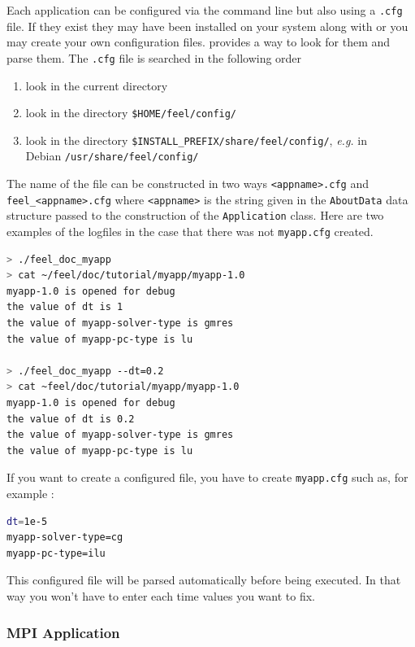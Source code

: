 Each application can be configured via the command line but also using a
\verb|.cfg| file. If they exist they may have been installed on your system
along with \feel or you may create your own configuration files.  \feel provides
a way to look for them and parse them.
\newline
The \verb|.cfg| file is searched in the following order
\begin{enumerate}
\item look in the current directory
\item look in the directory \verb|$HOME/feel/config/|
\item look in the directory \verb|$INSTALL_PREFIX/share/feel/config/|,
  \emph{e.g.} in\\ Debian \verb|/usr/share/feel/config/|
\end{enumerate}
The name of the file can be constructed in two ways \verb|<appname>.cfg| and
\verb|feel_<appname>.cfg| where \verb|<appname>| is the string given in the
\verb|AboutData| data structure passed to the construction of the
\verb|Application| class.
Here are two examples of the logfiles in the case that there was not \verb|myapp.cfg| created.

\begin{lstlisting}[language=sh]
> ./feel_doc_myapp
> cat ~/feel/doc/tutorial/myapp/myapp-1.0
myapp-1.0 is opened for debug
the value of dt is 1
the value of myapp-solver-type is gmres
the value of myapp-pc-type is lu

> ./feel_doc_myapp --dt=0.2
> cat ~feel/doc/tutorial/myapp/myapp-1.0
myapp-1.0 is opened for debug
the value of dt is 0.2
the value of myapp-solver-type is gmres
the value of myapp-pc-type is lu
\end{lstlisting}

If you want to create a configured file, you have to create \verb|myapp.cfg| such as, for example :
\begin{lstlisting}[language=sh]
dt=1e-5
myapp-solver-type=cg
myapp-pc-type=ilu
\end{lstlisting}
This configured file will be parsed automatically before being executed. In that way you won't have to enter each time values you want to fix.


\subsubsection{MPI Application}


